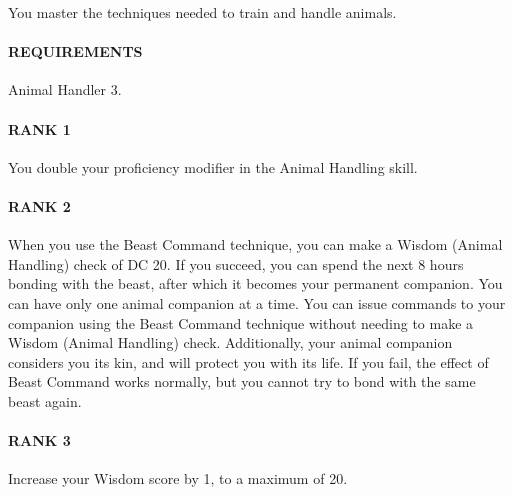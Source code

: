 \normalsize
You master the techniques needed to train and handle animals.
\paragraph{REQUIREMENTS} Animal Handler 3.
\paragraph{RANK 1} You double your proficiency modifier in the Animal Handling skill.
\paragraph{RANK 2} When you use the Beast Command technique, you can make a Wisdom (Animal Handling) check of DC 20.
If you succeed, you can spend the next 8 hours bonding with the beast, after which it becomes your permanent companion.
You can have only one animal companion at a time.
You can issue commands to your companion using the Beast Command technique without needing to make a Wisdom (Animal Handling) check.
Additionally, your animal companion considers you its kin, and will protect you with its life.
If you fail, the effect of Beast Command works normally, but you cannot try to bond with the same beast again.
\paragraph{RANK 3} Increase your Wisdom score by 1, to a maximum of 20.

